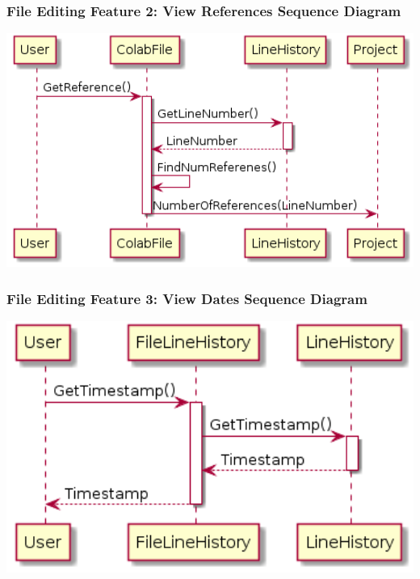 \documentclass[twoside,letterpaper]{article}
\begin{document}
	\newpage
	
	\subsubsection[File Editing Feature 2: View References Sequence Diagram]{\rmfamily\bfseries\color{black}
		File Editing Feature 2: View References Sequence Diagram}
	\hypertarget{RefHeading22059017292}{}
	
	\bigskip
	
	\includegraphics[width=6.0in]{images/SequenceDiagrams/References}
	
	\newpage
	
	
	\subsubsection[File Editing Feature 3: View Dates Sequence Diagram]{\rmfamily\bfseries\color{black}
		File Editing Feature 3: View Dates Sequence Diagram}
	\hypertarget{RefHeading22059017292}{}
	
	\bigskip
	
	\includegraphics[width=6.0in]{images/SequenceDiagrams/EditDate}
	
\end{document}
